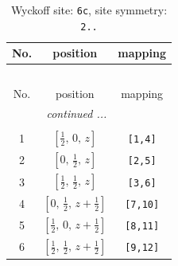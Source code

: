 \documentclass[fleqn,8pt]{jsarticle}
\begin{document}
\renewcommand{\arraystretch}{1.2}
\begin{longtable}{ccc}
\caption{Wyckoff site: {\tt 6c}, site symmetry: {\tt 2..}}
 \\
 \hline \hline
No. & position & mapping \\ \hline \endfirsthead

\multicolumn{2}{l}{\tablename\ \thetable{}} \\
 \hline \hline
No. & position & mapping \\ \hline \endhead

 \hline \hline
\multicolumn{2}{r}{\footnotesize\it continued ...} \\ \endfoot

 \hline \hline
\multicolumn{2}{r}{} \\ \endlastfoot

1 & $\left[ \frac{1}{2},\, 0,\, z \right]$ & {\tt [1,4]} \\ \hline
2 & $\left[ 0,\, \frac{1}{2},\, z \right]$ & {\tt [2,5]} \\ \hline
3 & $\left[ \frac{1}{2},\, \frac{1}{2},\, z \right]$ & {\tt [3,6]} \\ \hline
4 & $\left[ 0,\, \frac{1}{2},\, z + \frac{1}{2} \right]$ & {\tt [7,10]} \\ \hline
5 & $\left[ \frac{1}{2},\, 0,\, z + \frac{1}{2} \right]$ & {\tt [8,11]} \\ \hline
6 & $\left[ \frac{1}{2},\, \frac{1}{2},\, z + \frac{1}{2} \right]$ & {\tt [9,12]} \\
\end{longtable}
\renewcommand{\arraystretch}{1.2}
\end{document}
